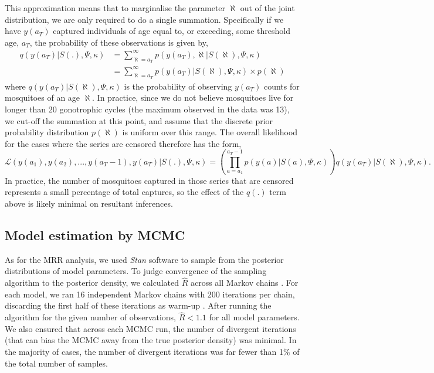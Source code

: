 \documentclass[12pt]{article}
\begin{document}
{This approximation means that to marginalise the parameter $\aleph$ out of the joint distribution, we are only required to do a single summation. Specifically if we have $y(a_T)$ captured individuals of age equal to, or exceeding, some threshold age, $a_T$, the probability of these observations is given by,
%
\begin{align}
q(y(a_T)|S(.),\Psi,\kappa) &= \sum_{\aleph=a_T}^{\infty} p(y(a_T),\aleph|S(\aleph),\Psi,\kappa)\\
&= \sum_{\aleph=a_T}^{\infty} p(y(a_T)|S(\aleph),\Psi,\kappa) \times p(\aleph)
\end{align}
%
where $q(y(a_T)|S(\aleph),\Psi,\kappa)$ is the probability of observing $y(a_T)$ counts for mosquitoes of an age $\aleph$. In practice, since we do not believe mosquitoes live for longer than 20 gonotrophic cycles (the maximum observed in the data was 13), we cut-off the summation at this point, and assume that the discrete prior probability distribution $p(\aleph)$ is uniform over this range. The overall likelihood for the cases where the series are censored therefore has the form,
%
\begin{equation}
\mathcal{L}(y(a_1),y(a_2),...,y(a_T-1),y(a_T)|S(.),\Psi,\kappa) = \left(\prod\limits_{a=a_1}^{a_T-1} p(y(a)|S(a),\Psi,\kappa)\right) q(y(a_T)|S(\aleph),\Psi,\kappa).
\end{equation}
%
In practice, the number of mosquitoes captured in those series that are censored represents a small percentage of total captures, so the effect of the $q(.)$ term above is likely minimal on resultant inferences.

\subsection{Model estimation by MCMC}\label{sec:dissection_MCMC}
As for the MRR analysis, we used \textit{Stan} software \citep{carpenter2016stan} to sample from the posterior distributions of model parameters. To judge convergence of the sampling algorithm to the posterior density, we calculated $\hat{R}$ across all Markov chains \citep{gelman1992inference}. For each model, we ran 16 independent Markov chains with 200 iterations per chain, discarding the first half of these iterations as warm-up \citep{gelman2014bayesian}. After running the algorithm for the given number of observations, $\hat{R}<1.1$ for all model parameters. We also ensured that across each MCMC run, the number of divergent iterations (that can bias the MCMC away from the true posterior density) was minimal. In the majority of cases, the number of divergent iterations was far fewer than 1\% of the total number of samples.

}
\end{document}
